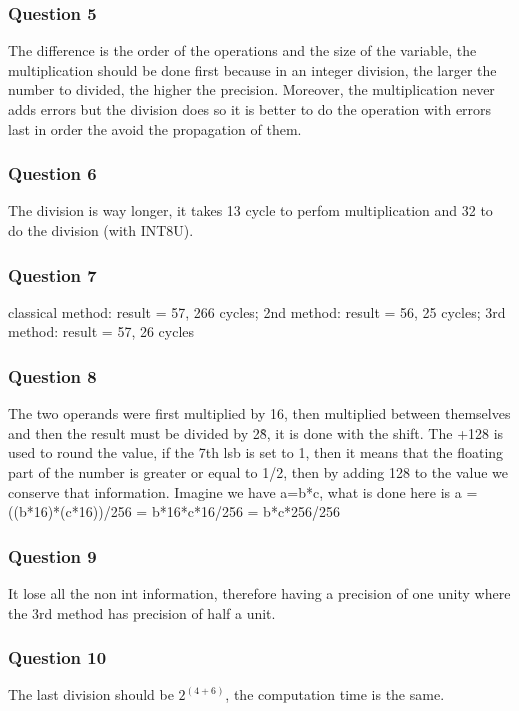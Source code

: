 \documentclass[a4paper,10pt]{article}
\begin{document}
\subsubsection*{Question 5}
The difference is the order of the operations and the size of the variable, the multiplication should be done first because in an integer division, the larger the number to divided, the higher the precision. Moreover, the multiplication never adds errors but the division does so it is better to do the operation with errors last in order the avoid the propagation of them.

\subsubsection*{Question 6}
The division is way longer, it takes 13 cycle to perfom multiplication and 32 to do the division (with INT8U).

\subsubsection*{Question 7}
classical method: result = 57, 266 cycles; 
2nd method: result = 56, 25 cycles; 
3rd method: result = 57, 26 cycles

\subsubsection*{Question 8}
The two operands were first multiplied by 16, then multiplied between themselves and then the result must be divided by 2\^8, it is done with the shift. The +128 is used to round the value, if the 7th lsb is set to 1, then it means that the floating part of the number is greater or equal to 1/2, then by adding 128 to the value we conserve that information. Imagine we have a=b*c, what is done here is a = ((b*16)*(c*16))/256 = b*16*c*16/256 = b*c*256/256

\subsubsection*{Question 9}
It lose all the non int information, therefore having a precision of one unity where the 3rd method has precision of half a unit.

\subsubsection*{Question 10}
The last division should be $2^{(4+6)}$, the computation time is the same.
\end{document}
